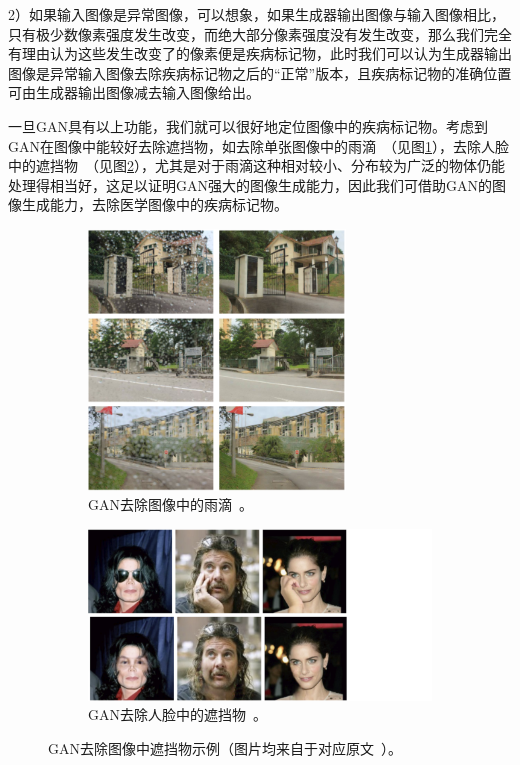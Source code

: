 2）如果输入图像是异常图像，可以想象，如果生成器输出图像与输入图像相比，只有极少数像素强度发生改变，而绝大部分像素强度没有发生改变，那么我们完全有理由认为这些发生改变了的像素便是疾病标记物，此时我们可以认为生成器输出图像是异常输入图像去除疾病标记物之后的“正常”版本，且疾病标记物的准确位置可由生成器输出图像减去输入图像给出。

\noindent 一旦GAN具有以上功能，我们就可以很好地定位图像中的疾病标记物。考虑到GAN在图像中能较好去除遮挡物，如去除单张图像中的雨滴~\cite{qian2018attentive}（见图\ref{subfig:attention_gan}），去除人脸中的遮挡物~\cite{yuan2019face}（见图\ref{subfig:face_de_occulusion}），尤其是对于雨滴这种相对较小、分布较为广泛的物体仍能处理得相当好，这足以证明GAN强大的图像生成能力，因此我们可借助GAN的图像生成能力，去除医学图像中的疾病标记物。
\begin{figure}[h!]
	\begin{subfigure}{0.45\textwidth}
		\centering
		\includegraphics[width=0.75\textwidth]{figure/attention_gan_example.png}
		\caption{GAN去除图像中的雨滴~\cite{qian2018attentive}。}
		\label{subfig:attention_gan}
	\end{subfigure}
	\begin{subfigure}{0.45\textwidth}
		\centering
		\includegraphics[width=1.5\textwidth]{figure/face_de_occulusion.png}
		\caption{GAN去除人脸中的遮挡物~\cite{yuan2019face}。}
		\label{subfig:face_de_occulusion}
	\end{subfigure}
	\caption[GAN去除图像中遮挡物示例]{GAN去除图像中遮挡物示例（图片均来自于对应原文~\cite{qian2018attentive,yuan2019face}）。}
	\label{mul_fig:gan_auto_encoder_example}
\end{figure}

